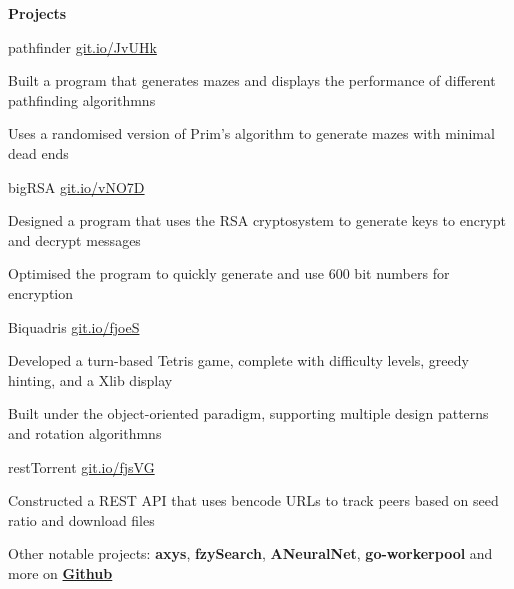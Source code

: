 \documentclass{resume} %
\DeclareRobustCommand{\&}{%
  \ifdim\fontdimen1\font>0pt
    \textsl{\symbol{`\&}}%
  \else
    \symbol{`\&}%
  \fi
}
\begin{document}

\begin{rSection}{\textbf{Projects}}

\begin{rProjectSection}{pathfinder}
		{{\href{https://github.com/MSJawad/pathfinder}
				{git.io/JvUHk}}}
		
		\item Built a program that generates mazes and displays the performance of different pathfinding algorithmns
		\item	Uses a randomised version of Prim's algorithm to generate mazes with minimal dead ends
	\end{rProjectSection}

  \begin{rProjectSection}{bigRSA}
	  {{\href{https://github.com/MSJawad/bigRSA}
		    {git.io/vNO7D}}}

    \item Designed a program that uses the RSA cryptosystem to generate keys to encrypt and decrypt messages
    \item Optimised the program to quickly generate and use 600 bit numbers for encryption
    
    \end{rProjectSection}
    
   \begin{rProjectSection}{Biquadris}
	  {{\href{https://github.com/MiltonIp/Biquadris}
		    {git.io/fjoeS}}}
    \item Developed a turn-based Tetris game, complete with difficulty levels, greedy hinting, and a Xlib display
    \item Built under the object{-}oriented paradigm, supporting multiple design patterns and rotation algorithmns
 
  \end{rProjectSection}
	
	  \begin{rProjectSection}{restTorrent}
		{{\href{https://github.com/MSJawad/restTorrent}
				{git.io/fjsVG}}}
		\item  Constructed a REST API that uses bencode URLs to track peers based on seed ratio and download files
				
	\end{rProjectSection}	
	
  \begin{rMinisection}
      \item {Other notable projects:} {\textbf{axys}},{ \textbf{fzySearch}},
     {\textbf{ANeuralNet}}, {\textbf{go-workerpool}} and more on
      \href{https://github.com/MSJawad}{\textbf{Github}}
\end{rMinisection}
\end{rSection}
\end{document}
